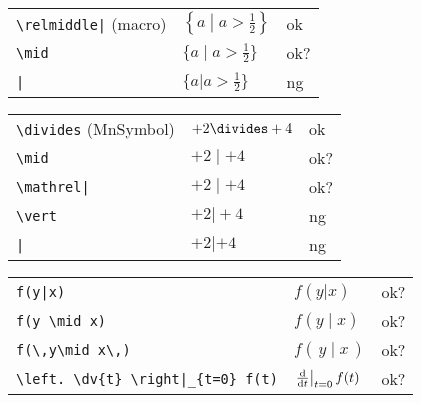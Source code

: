 \documentclass[a4paper]{article}
\newcommand{\tA}[1]{\textcolor{cA}{#1}}
\newcommand{\tC}[1]{\textcolor{cC}{#1}}
\newcommand{\tD}[1]{\textcolor{cD}{#1}}
\begin{document}
\begin{table}[H]
	\centering
	\begin{tabular}{lll}
		\verb#\relmiddle|# (macro) & $\displaystyle{\left\{ a \mathrel{}\middle|\mathrel{} a>\frac{1}{2} \right\}}$ & \tA{ok}  \\
		\verb#\mid#                & $\displaystyle{\{ a \mid a>\frac{1}{2} \}}$                                    & \tC{ok?} \\
		\verb#|#                   & $\displaystyle{\{ a | a>\frac{1}{2} \}}$                                       & \tD{ng}
	\end{tabular}
\end{table}

\begin{table}[H]
	\centering
	\begin{tabular}{lll}
		\verb#\divides# (MnSymbol) & $+2 \divides +4$  & \tA{ok}  \\
		\verb#\mid#                & $+2 \mid +4$      & \tC{ok?} \\
		\verb#\mathrel|#           & $+2 \mathrel| +4$ & \tC{ok?} \\
		\verb#\vert#               & $+2 \vert +4$     & \tD{ng}  \\
		\verb#|#                   & $+2 | +4$         & \tD{ng}  \\
	\end{tabular}
\end{table}

\begin{table}[H]
	\centering
	\begin{tabular}{lll}
		\verb#f(y|x)#                           & $f(y|x)$                           & \tC{ok?} \\
		\verb#f(y \mid x)#                      & $f(y \mid x)$                      & \tC{ok?} \\
		\verb#f(\,y\mid x\,)#                   & $f(\,y\mid x\,)$                   & \tC{ok?} \\
		\verb#\left. \dv{t} \right|_{t=0} f(t)# & $\left. \dv{t} \right|_{t=0} f(t)$ & \tC{ok?} \\
	\end{tabular}
\end{table}

\end{document}
